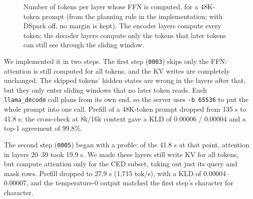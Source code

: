 \documentclass[11pt,a4paper]{article}
\newcommand{\code}[1]{\texttt{#1}}
\newcommand{\tps}{tok/s}
\begin{document}
\begin{figure}[t]
  \centering
  \caption{Number of tokens per layer whose FFN is computed, for a 48K-token prompt (from the planning rule in the implementation; with DSpark off, no margin is kept). The encoder layers compute every token; the decoder layers compute only the tokens that later tokens can still see through the sliding window.}
  \label{fig:ced}
\end{figure}

We implemented it in two steps. The first step (\code{0003}) skips only the FFN: attention is still computed for all tokens, and the KV writes are completely unchanged. The skipped tokens' hidden states are wrong in the layers after that, but they only enter sliding windows that no later token reads. Each \code{llama\_decode} call plans from its own end, so the server uses \code{-b 65536} to put the whole prompt into one call. Prefill of a 48K-token prompt dropped from 135 s to 41.8 s; the cross-check at 8k/16k context gave a KLD of 0.00006 / 0.00004 and a top-1 agreement of 99.8\%.

The second step (\code{0005}) began with a profile: of the 41.8 s at that point, attention in layers 20--39 took 19.9 s. We made these layers still write KV for all tokens, but compute attention only for the CED subset, taking out just its query and mask rows. Prefill dropped to 27.9 s (1,715 \tps{}), with a KLD of 0.00004--0.00007, and the temperature-0 output matched the first step's character for character.
\end{document}
